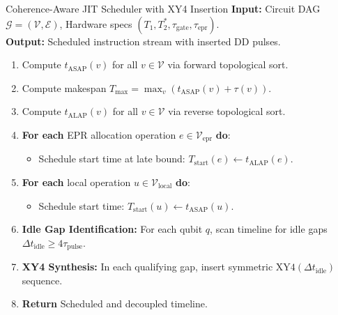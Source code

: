 \begin{algorithmbox}{Coherence-Aware JIT Scheduler with XY4 Insertion}
\textbf{Input:} Circuit DAG $\mathcal{G} = (\mathcal{V}, \mathcal{E})$, Hardware specs $(T_1, T_2^*, \tau_{\text{gate}}, \tau_{\text{epr}})$.\\
\textbf{Output:} Scheduled instruction stream with inserted DD pulses.

\begin{enumerate}[leftmargin=1.5em]
    \item Compute $t_{\text{ASAP}}(v)$ for all $v \in \mathcal{V}$ via forward topological sort.
    \item Compute makespan $T_{\max} = \max_v (t_{\text{ASAP}}(v) + \tau(v))$.
    \item Compute $t_{\text{ALAP}}(v)$ for all $v \in \mathcal{V}$ via reverse topological sort.
    \item \textbf{For each} EPR allocation operation $e \in \mathcal{V}_{\text{epr}}$ \textbf{do}:
    \begin{itemize}
        \item Schedule start time at late bound: $T_{\text{start}}(e) \leftarrow t_{\text{ALAP}}(e)$.
    \end{itemize}
    \item \textbf{For each} local operation $u \in \mathcal{V}_{\text{local}}$ \textbf{do}:
    \begin{itemize}
        \item Schedule start time: $T_{\text{start}}(u) \leftarrow t_{\text{ASAP}}(u)$.
    \end{itemize}
    \item \textbf{Idle Gap Identification:} For each qubit $q$, scan timeline for idle gaps $\Delta t_{\text{idle}} \ge 4 \tau_{\text{pulse}}$.
    \item \textbf{XY4 Synthesis:} In each qualifying gap, insert symmetric $\text{XY4}(\Delta t_{\text{idle}})$ sequence.
    \item \textbf{Return} Scheduled and decoupled timeline.
\end{enumerate}
\end{algorithmbox}


